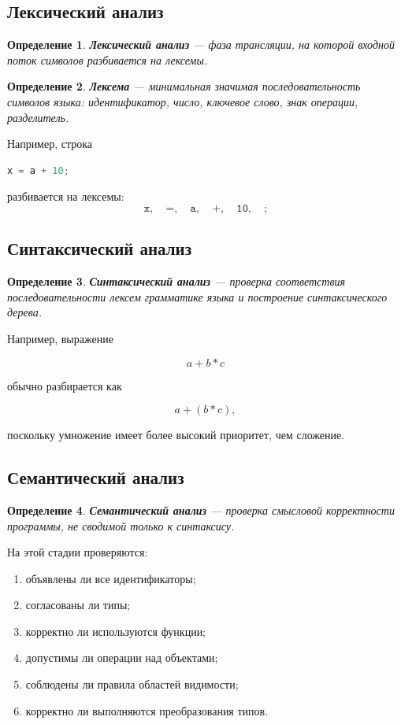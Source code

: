 \documentclass[12pt,a4paper]{article}
\newtheorem{definition}{Определение}
\begin{document}
\subsection{Лексический анализ}

\begin{definition}
\textbf{Лексический анализ} --- фаза трансляции, на которой входной поток символов разбивается на лексемы.
\end{definition}

\begin{definition}
\textbf{Лексема} --- минимальная значимая последовательность символов языка: идентификатор, число, ключевое слово, знак операции, разделитель.
\end{definition}

Например, строка

\begin{lstlisting}[language=C]
x = a + 10;
\end{lstlisting}

разбивается на лексемы:
\[
\texttt{x},\quad \texttt{=},\quad \texttt{a},\quad \texttt{+},\quad \texttt{10},\quad \texttt{;}
\]

\subsection{Синтаксический анализ}

\begin{definition}
\textbf{Синтаксический анализ} --- проверка соответствия последовательности лексем грамматике языка и построение синтаксического дерева.
\end{definition}

Например, выражение

\[
a + b * c
\]

обычно разбирается как

\[
a + (b * c),
\]

поскольку умножение имеет более высокий приоритет, чем сложение.

\subsection{Семантический анализ}

\begin{definition}
\textbf{Семантический анализ} --- проверка смысловой корректности программы, не сводимой только к синтаксису.
\end{definition}

На этой стадии проверяются:
\begin{enumerate}
  \item объявлены ли все идентификаторы;
  \item согласованы ли типы;
  \item корректно ли используются функции;
  \item допустимы ли операции над объектами;
  \item соблюдены ли правила областей видимости;
  \item корректно ли выполняются преобразования типов.
\end{enumerate}
\end{document}
